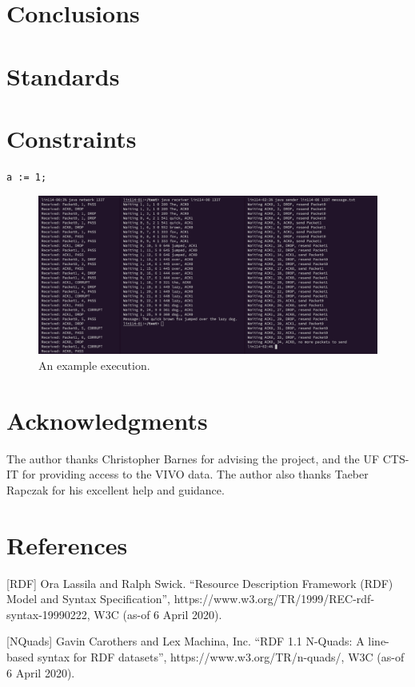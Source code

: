 \documentclass[11pt]{article}
\begin{document}
\section*{Conclusions}

\section*{Standards}

\section*{Constraints}

\begin{lstlisting}
a := 1;
\end{lstlisting}

\begin{figure}[h!]
\centering
\includegraphics[width=\textwidth]{output.png}
\caption{An example execution.}
\label{fig:output}
\end{figure}

\section*{Acknowledgments}
The author thanks Christopher Barnes for advising the project, and the UF CTS-IT for providing access to the VIVO data. The author also thanks Taeber Rapczak for his excellent help and guidance.

\section*{References}
[RDF] Ora Lassila and Ralph Swick. “Resource Description Framework (RDF) Model and Syntax Specification”, https://www.w3.org/TR/1999/REC-rdf-syntax-19990222, W3C (as-of 6 April 2020).

[NQuads] Gavin Carothers and Lex Machina, Inc. “RDF 1.1 N-Quads: A line-based syntax for RDF datasets”, https://www.w3.org/TR/n-quads/, W3C (as-of 6 April 2020).
\end{document}
